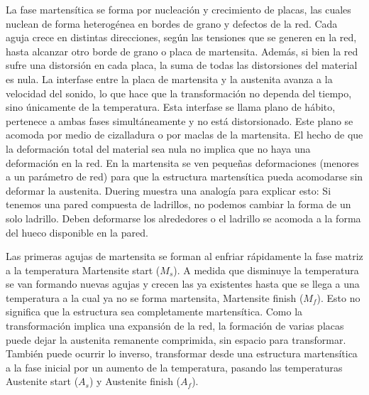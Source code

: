 \documentclass[a4paper,12pt,fleqn,twoside,openany]{book}
\begin{document}
La fase martensítica se forma por nucleación y crecimiento de placas, las cuales nuclean de forma heterogénea en bordes de grano y defectos de la red. 
Cada aguja crece en distintas direcciones, según las tensiones que se generen en la red, hasta alcanzar otro borde de grano o placa de martensita. 
Además, si bien la red sufre una distorsión en cada placa, la suma de todas las distorsiones del material es nula. 
La interfase entre la placa de martensita y la austenita avanza a la velocidad del sonido, lo que hace que la transformación no dependa del 
tiempo, sino únicamente de la temperatura. Esta interfase se llama plano de hábito, pertenece a ambas fases 
simultáneamente y no está distorsionado. Este plano se acomoda por medio de cizalladura o por maclas de la martensita. 
El hecho de que la deformación total del material sea nula no implica que no haya una deformación en la red. En la martensita se ven pequeñas 
deformaciones (menores a un parámetro de red) para que la estructura martensítica pueda acomodarse sin deformar la austenita. 
Duering \cite{duering} muestra una analogía para explicar esto: Si tenemos una pared compuesta de ladrillos, no podemos cambiar la forma de un solo ladrillo. 
Deben deformarse los alrededores o el ladrillo se acomoda a la forma del hueco disponible en la pared.


Las primeras agujas de martensita se forman al enfriar rápidamente la fase matriz a la temperatura Martensite start ($M_{s}$). 
A medida que disminuye la temperatura se van formando nuevas agujas y crecen las ya existentes hasta que se llega a una temperatura 
a la cual ya no se forma martensita, Martensite finish ($M_{f}$). Esto no significa que la estructura sea completamente martensítica. 
Como la transformación implica una expansión de la red, la formación de varias placas puede dejar la austenita remanente comprimida, 
sin espacio para transformar. También puede ocurrir lo inverso, transformar desde una estructura martensítica a la fase inicial 
por un aumento de la temperatura, pasando las temperaturas Austenite start ($A_{s}$) y Austenite finish ($A_{f}$).

  
\end{document}
